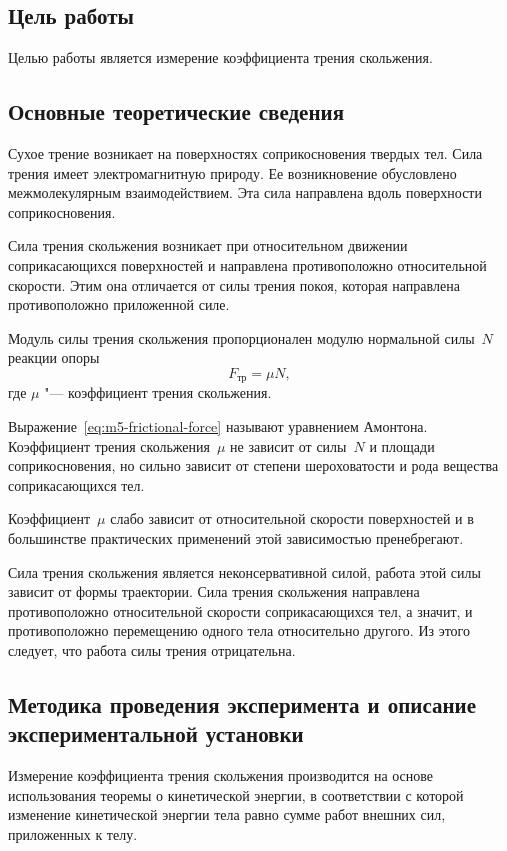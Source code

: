 \documentclass[a4paper, 12pt]{extarticle}
\begin{document}
\MTDTitlePage
\MTDInfoPage

\setcounter{section}{5}

\subsection{Цель работы}
Целью работы является измерение коэффициента трения скольжения.

\subsection{Основные теоретические сведения}
Сухое трение возникает на поверхностях соприкосновения твердых тел. Сила трения имеет электромагнитную природу. Ее возникновение обусловлено межмолекулярным взаимодействием. Эта сила направлена вдоль поверхности соприкосновения.

Сила трения скольжения возникает при относительном движении соприкасающихся поверхностей и направлена противоположно относительной скорости. Этим она отличается от силы трения покоя, которая направлена противоположно приложенной силе.

Модуль силы трения скольжения пропорционален модулю нормальной силы~$N$ реакции опоры
\begin{equation}
\label{eq:m5-frictional-force}
F_\text{тр} = \mu N,
\end{equation}
где $\mu$ "--- коэффициент трения скольжения.

Выражение~\eqref{eq:m5-frictional-force} называют уравнением Амонтона. Коэффициент трения скольжения~$\mu$ не зависит от силы~$N$ и площади соприкосновения, но сильно зависит от степени шероховатости и рода вещества соприкасающихся тел.

Коэффициент~$\mu$ слабо зависит от относительной скорости поверхностей и в большинстве практических применений  этой зависимостью пренебрегают.

Сила трения скольжения является неконсервативной силой, работа этой  силы зависит от формы траектории. Сила трения скольжения направлена противоположно относительной скорости соприкасающихся тел, а значит, и противоположно перемещению одного тела относительно другого. Из  этого следует, что работа силы трения отрицательна.

\subsection{Методика проведения эксперимента и описание экспериментальной установки}
Измерение коэффициента трения скольжения производится на основе использования теоремы о кинетической энергии, в соответствии с которой изменение кинетической энергии тела равно сумме работ внешних сил, приложенных к телу.
\end{document}
